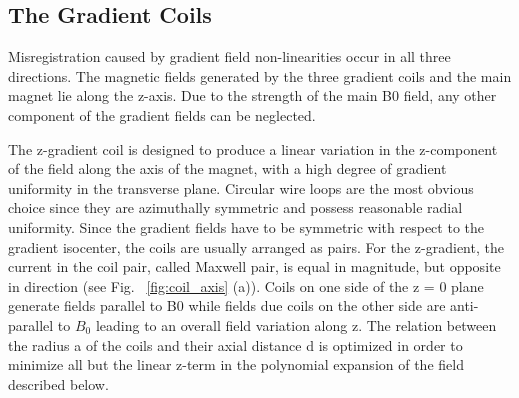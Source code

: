 \subsection{The Gradient Coils}

Misregistration caused by gradient field non-linearities occur in all three directions. The magnetic 
fields generated by the three gradient coils and the main magnet lie along the z-axis.  Due to the 
strength of the main B0 field, any other component of the gradient fields can be neglected. 

The z-gradient coil is designed to produce a linear variation in the z-component of the field along the
axis of the magnet, with a high degree of gradient uniformity in the transverse plane. Circular wire 
loops are the most obvious choice since they are azimuthally symmetric and possess reasonable radial 
uniformity. Since the gradient fields have to be symmetric with respect to the gradient isocenter, the 
coils are usually arranged as pairs. For the z-gradient, the current in the coil pair, called Maxwell 
pair, is equal in magnitude, but opposite in direction (see Fig. ~\ref{fig:coil_axis} (a)). 
Coils on one side of the z = 0 
plane generate fields parallel to B0 while fields due coils on the other side are anti-parallel to 
$B_0$ 
leading to an overall field variation along z. The relation between the radius a of the coils and their
axial distance d is optimized in order to minimize all but the linear z-term in the polynomial 
expansion of the field described below.
 
